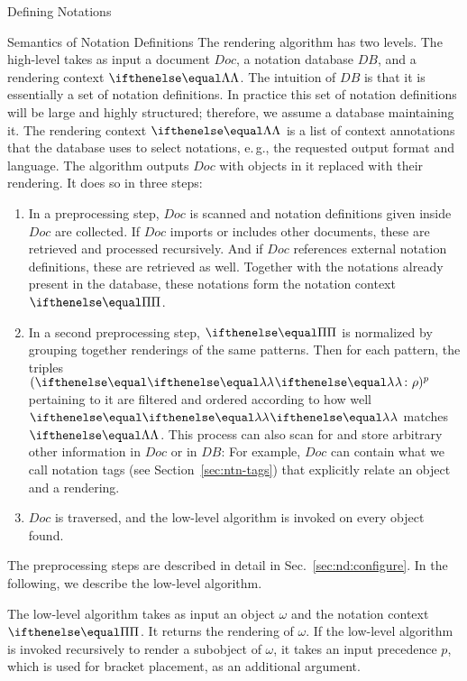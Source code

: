 \begin{omgroup}[creators=miko,short={Notation and Presentation},id=pres]
\begin{omgroup}[creators={miko,frabe},id=sec:ntn-definition]{Defining Notations}
\begin{omgroup}[id=sec:nd:semantics]{Semantics of Notation Definitions}
The rendering algorithm has two levels. The high-level takes as input a document $Doc$, a notation database $DB$, and a rendering context $\RC{}{}$.
The intuition of $DB$ is that it is essentially a set of notation definitions. In practice this set of notation definitions will be large and highly structured; therefore, we assume a database maintaining it. The rendering context $\RC{}{}$ is a list of context annotations that the database uses to select notations, e.\,g., the requested output format and language. The algorithm outputs $Doc$ with {\openmath} objects in it replaced with their rendering. It does so in three steps:
\begin{enumerate}
\item In a preprocessing step, $Doc$ is scanned and notation definitions given inside $Doc$ are collected. If $Doc$ imports or includes other documents, these are retrieved and processed recursively. And if $Doc$ references external notation definitions, these are retrieved as well. Together with the notations already present in the database, these notations form the notation context $\NC{}$.
\item In a second preprocessing step, $\NC{}$ is normalized by grouping together renderings of the same patterns. Then for each pattern, the triples $\arp{\ca{}{}}{\rho}{p}$ pertaining to it are filtered and ordered according to how well $\ca{}{}$ matches $\RC{}{}$. This process can also scan for and store arbitrary other information in $Doc$ or in $DB$: For example, $Doc$ can contain what we call notation tags (see Section~\ref{sec:ntn-tags}) that explicitly relate an {\openmath} object and a rendering.
\item $Doc$ is traversed, and the low-level algorithm is invoked on every {\openmath} object found.
\end{enumerate}
The preprocessing steps are described in detail in Sec.~\ref{sec:nd:configure}. In the following, we describe the low-level algorithm.

The low-level algorithm takes as input an {\openmath} object $\omega$ and the notation context $\NC{}$. It returns the rendering of $\omega$. If the low-level algorithm is invoked recursively to render a subobject of $\omega$, it takes an input precedence $p$, which is used for bracket placement, as an additional argument.


\end{omgroup}
\end{omgroup}
\end{omgroup}
